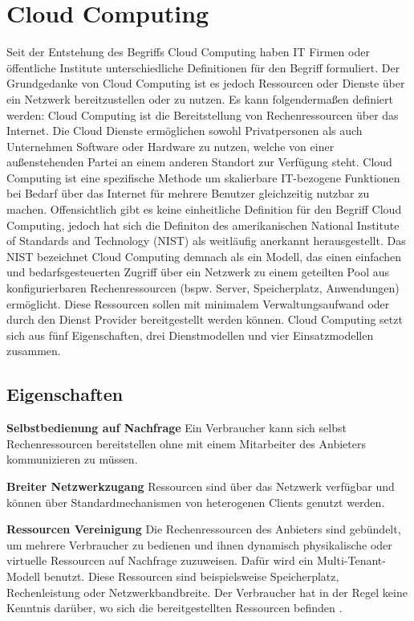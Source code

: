 \section{Cloud Computing}
Seit der Entstehung des Begriffs \glqq Cloud Computing\grqq{} haben IT Firmen oder öffentliche Institute unterschiedliche Definitionen für den Begriff formuliert. Der Grundgedanke von Cloud Computing ist es jedoch Ressourcen oder Dienste über ein Netzwerk bereitzustellen oder zu nutzen. Es kann folgendermaßen definiert werden: Cloud Computing ist die Bereitstellung von Rechenressourcen über das Internet. Die Cloud Dienste ermöglichen sowohl Privatpersonen als auch Unternehmen Software oder Hardware zu nutzen, welche von einer außenstehenden Partei an einem anderen Standort zur Verfügung steht\cite{canada}. Cloud Computing ist eine spezifische Methode um skalierbare IT-bezogene Funktionen bei Bedarf über das Internet für mehrere Benutzer gleichzeitig nutzbar zu machen\cite{gartner}.
Offensichtlich gibt es keine einheitliche Definition für den Begriff \glqq Cloud Computing\grqq, jedoch hat sich die Definiton des amerikanischen National Institute of Standards and Technology (NIST) als weitläufig anerkannt herausgestellt. Das NIST bezeichnet Cloud Computing demnach als ein Modell, das einen einfachen und bedarfsgesteuerten Zugriff über ein Netzwerk zu einem geteilten Pool aus konfigurierbaren Rechenressourcen (bspw. Server, Speicherplatz, Anwendungen) ermöglicht. Diese Ressourcen sollen mit minimalem Verwaltungsaufwand oder durch den Dienst Provider bereitgestellt werden können. Cloud Computing setzt sich aus fünf Eigenschaften, drei Dienstmodellen und vier Einsatzmodellen zusammen\cite{nist_definition}.

\subsection{Eigenschaften}

\textbf{Selbstbedienung auf Nachfrage} 
Ein Verbraucher kann sich selbst Rechenressourcen bereitstellen ohne mit einem Mitarbeiter des Anbieters kommunizieren zu müssen\cite{nist_definition}.

\textbf{Breiter Netzwerkzugang}
Ressourcen sind über das Netzwerk verfügbar und können über Standardmechanismen von heterogenen Clients genutzt werden\cite{nist_definition}.

\textbf{Ressourcen Vereinigung}
Die Rechenressourcen des Anbieters sind gebündelt, um mehrere Verbraucher zu bedienen und ihnen dynamisch physikalische oder virtuelle Ressourcen auf Nachfrage zuzuweisen. Dafür wird ein Multi-Tenant-Modell benutzt. Diese Ressourcen sind beispielsweise Speicherplatz, Rechenleistung oder Netzwerkbandbreite. Der Verbraucher hat in der Regel keine Kenntnis darüber, wo sich die bereitgestellten Ressourcen befinden \cite{nist_definition}.

